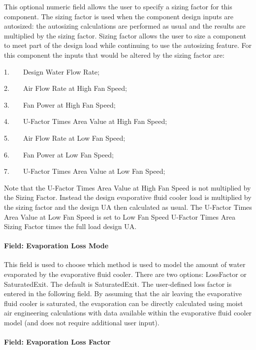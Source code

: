 This optional numeric field allows the user to specify a sizing factor for this component. The sizing factor is used when the component design inputs are autosized: the autosizing calculations are performed as usual and the results are multiplied by the sizing factor. Sizing factor allows the user to size a component to meet part of the design load while continuing to use the autosizing feature. For this component the inputs that would be altered by the sizing factor are:

1.~~~~Design Water Flow Rate;

2.~~~~Air Flow Rate at High Fan Speed;

3.~~~~Fan Power at High Fan Speed;

4.~~~~U-Factor Times Area Value at High Fan Speed;

5.~~~~Air Flow Rate at Low Fan Speed;

6.~~~~Fan Power at Low Fan Speed;

7.~~~~U-Factor Times Area Value at Low Fan Speed;

Note that the U-Factor Times Area Value at High Fan Speed is not multiplied by the Sizing Factor. Instead the design evaporative fluid cooler load is multiplied by the sizing factor and the design UA then calculated as usual. The U-Factor Times Area Value at Low Fan Speed is set to Low Fan Speed U-Factor Times Area Sizing Factor times the full load design UA.

\paragraph{Field: Evaporation Loss Mode}\label{field-evaporation-loss-mode-5}

This field is used to choose which method is used to model the amount of water evaporated by the evaporative fluid cooler. There are two options: LossFactor or SaturatedExit. The default is SaturatedExit. The user-defined loss factor is entered in the following field. By assuming that the air leaving the evaporative fluid cooler is saturated, the evaporation can be directly calculated using moist air engineering calculations with data available within the evaporative fluid cooler model (and does not require additional user input).

\paragraph{Field: Evaporation Loss Factor}\label{field-evaporation-loss-factor-5}

